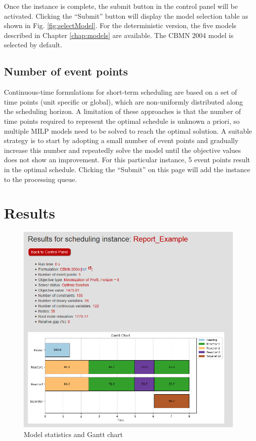 Once the instance is complete, the submit button in the control panel will be activated. Clicking the ``Submit'' button will display the model selection table as shown in Fig. \ref{fig:selectModel}. For the deterministic version, the five models described in Chapter \ref{chap:models} are available. The CBMN 2004 model is selected by default. 

\subsection{Number of event points}
\label{subsec:eventpoints}
Continuous-time formulations for short-term scheduling are based on a set of time points (unit specific or global), which are non-uniformly distributed along the scheduling horizon. A limitation of these approaches is that the number of time points required to represent the optimal schedule is unknown a priori, so multiple MILP models need to be solved to reach the optimal solution. A suitable strategy is to start by adopting a small number of event points and gradually increase this number and repeatedly solve the model until the objective values does not show an improvement. For this particular instance, 5 event points result in the optimal schedule. Clicking the ``Submit'' on this page will add the instance to the processing queue.

\section{Results}
\begin{figure}[htbp]
\centering
\includegraphics[width=\linewidth]{Images/Results.png}
\caption{Model statistics and Gantt chart}
\label{fig:results}
\end{figure}

